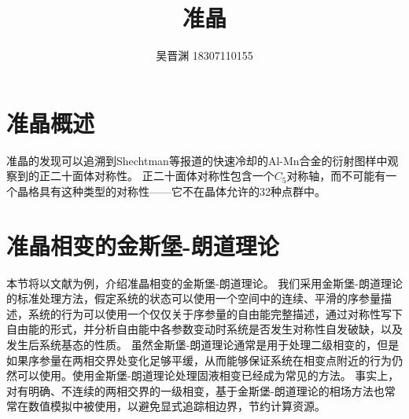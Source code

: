 \documentclass[hyperref, UTF8, a4paper]{ctexart}
\title{准晶}
\author{吴晋渊 18307110155}
\date{}
\begin{document}
\maketitle

\section{准晶概述}

准晶的发现可以追溯到Shechtman等报道的快速冷却的Al-Mn合金的衍射图样中观察到的正二十面体对称性\cite{PhysRevLett.53.1951}。
正二十面体对称性包含一个$C_5$对称轴，而不可能有一个晶格具有这种类型的对称性——它不在晶体允许的32种点群中\cite{Johnston_1960}。


\section{准晶相变的金斯堡-朗道理论}

本节将以文献\cite{PhysRevB.32.5764}为例，介绍准晶相变的金斯堡-朗道理论。
我们采用金斯堡-朗道理论的标准处理方法，假定系统的状态可以使用一个空间中的连续、平滑的序参量描述，系统的行为可以使用一个仅仅关于序参量的自由能完整描述，通过对称性写下自由能的形式，并分析自由能中各参数变动时系统是否发生对称性自发破缺，以及发生后系统基态的性质。
虽然金斯堡-朗道理论通常是用于处理二级相变的，但是如果序参量在两相交界处变化足够平缓，从而能够保证系统在相变点附近的行为仍然可以使用。使用金斯堡-朗道理论处理固液相变已经成为常见的方法\cite{fabrizio2008,PhysRevB.90.104101}。
事实上，对有明确、不连续的两相交界的一级相变，基于金斯堡-朗道理论的相场方法\cite{provatas2011phase}也常常在数值模拟中被使用，以避免显式追踪相边界，节约计算资源\cite{boettinger2002phase}。
\end{document}
